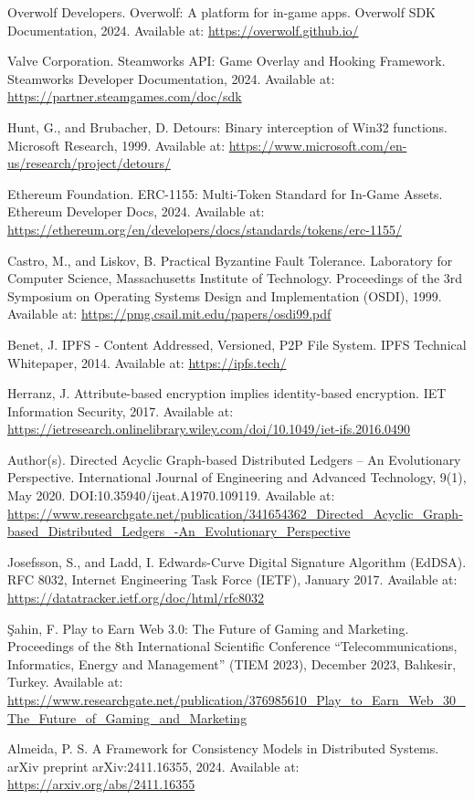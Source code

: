 \documentclass[11pt]{article}
\begin{document}
\begin{thebibliography}{99}
Overwolf Developers. Overwolf: A platform for in-game apps. Overwolf SDK Documentation, 2024. Available at: \url{https://overwolf.github.io/}

Valve Corporation. Steamworks API: Game Overlay and Hooking Framework. Steamworks Developer Documentation, 2024. Available at: \url{https://partner.steamgames.com/doc/sdk}

Hunt, G., and Brubacher, D. Detours: Binary interception of Win32 functions. Microsoft Research, 1999. Available at: \url{https://www.microsoft.com/en-us/research/project/detours/}

Ethereum Foundation. ERC-1155: Multi-Token Standard for In-Game Assets. Ethereum Developer Docs, 2024. Available at: \url{https://ethereum.org/en/developers/docs/standards/tokens/erc-1155/}

Castro, M., and Liskov, B. Practical Byzantine Fault Tolerance. Laboratory for Computer Science, Massachusetts Institute of Technology. Proceedings of the 3rd Symposium on Operating Systems Design and Implementation (OSDI), 1999. Available at: \url{https://pmg.csail.mit.edu/papers/osdi99.pdf}

Benet, J. IPFS - Content Addressed, Versioned, P2P File System. IPFS Technical Whitepaper, 2014. Available at: \url{https://ipfs.tech/}

Herranz, J. Attribute-based encryption implies identity-based encryption. IET Information Security, 2017. Available at: \url{https://ietresearch.onlinelibrary.wiley.com/doi/10.1049/iet-ifs.2016.0490}

Author(s). Directed Acyclic Graph-based Distributed Ledgers – An Evolutionary Perspective. International Journal of Engineering and Advanced Technology, 9(1), May 2020. DOI:10.35940/ijeat.A1970.109119. Available at: \url{https://www.researchgate.net/publication/341654362_Directed_Acyclic_Graph-based_Distributed_Ledgers_-An_Evolutionary_Perspective}

Josefsson, S., and Ladd, I. Edwards-Curve Digital Signature Algorithm (EdDSA). RFC 8032, Internet Engineering Task Force (IETF), January 2017. Available at: \url{https://datatracker.ietf.org/doc/html/rfc8032}

Şahin, F. Play to Earn Web 3.0: The Future of Gaming and Marketing. Proceedings of the 8th International Scientific Conference “Telecommunications, Informatics, Energy and Management” (TIEM 2023), December 2023, Balıkesir, Turkey. Available at: \url{https://www.researchgate.net/publication/376985610_Play_to_Earn_Web_30_The_Future_of_Gaming_and_Marketing}

Almeida, P. S. A Framework for Consistency Models in Distributed Systems. arXiv preprint arXiv:2411.16355, 2024. Available at: \url{https://arxiv.org/abs/2411.16355}


\end{thebibliography}
\end{document}
